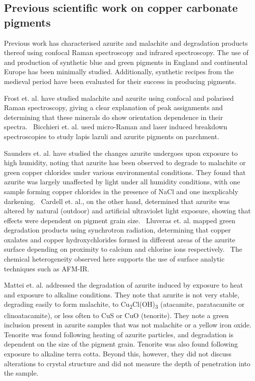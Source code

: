 \subsection[Previous scientific work on copper carbonate pigments]{Previous scientific work on copper carbonate pigments}
\label{subsection1.1.5}

Previous work has characterised azurite and malachite and degradation products thereof using confocal Raman spectroscopy and infrared spectroscopy. The use of and production of synthetic blue and green pigments in England and continental Europe has been minimally studied. Additionally, synthetic recipes from the medieval period have been evaluated for their success in producing pigments.

Frost et. al. have studied malachite and azurite using confocal and polarised Raman spectroscopy, giving a clear explanation of peak assignments and determining that these minerals do show orientation dependence in their spectra.~\autocite{Frost} Bicchieri et. al. used micro-Raman and laser induced breakdown spectroscopies to study lapis lazuli and azurite pigments on parchment.~\autocite{Bicchieri} 

Saunders et. al. have studied the changes azurite undergoes upon exposure to high humidity, noting that azurite has been observed to degrade to malachite or green copper chlorides under various environmental conditions. They found that azurite was largely unaffected by light under all humidity conditions, with one sample forming copper chlorides in the presence of NaCl and one inexplicably darkening.~\autocite{Saunders} Cardell et. al., on the other hand, determined that azurite was altered by natural (outdoor) and artificial ultraviolet light exposure, showing that effects were dependent on pigment grain size.~\autocite{Cardell} Lluveras et. al. mapped green degradation products using synchrotron radiation, determining that copper oxalates and copper hydroxychlorides formed in different areas of the azurite surface depending on proximity to calcium and chlorine ions respectively.~\autocite{Lluveras} The chemical heterogeneity observed here supports the use of surface analytic techniques such as AFM-IR. 

Mattei et. al. addressed the degradation of azurite induced by exposure to heat and exposure to alkaline conditions. They note that azurite is not very stable, degrading easily to form malachite, to Cu\textsubscript{2}Cl(OH)\textsubscript{3} (atacamite, paratacamite or clinoatacamite), or less often to CuS or CuO (tenorite). They note a green inclusion present in azurite samples that was not malachite or a yellow iron oxide. Tenorite was found following heating of azurite particles, and degradation is dependent on the size of the pigment grain. Tenorite was also found following exposure to alkaline terra cotta. Beyond this, however, they did not discuss alterations to crystal structure and did not measure the depth of penetration into the sample.~\autocite{Mattei} 


